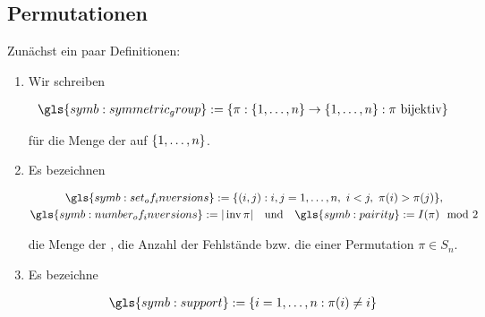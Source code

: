         \subsection{Permutationen}

            Zunächst ein paar Definitionen:

            \begin{definition} \label{def:permutations}
                
                \begin{enumerate}[label = \arabic*.]
    
                    \item Wir schreiben
    
                    \begin{align*}
                        \gls{symb:symmetric_group} := \Bbraces{\pi: \Bbraces{1, \dots, n} \to \Bbraces{1, \dots, n}: \pi ~ \text{bijektiv}}
                    \end{align*}
        
                    für die Menge der  auf ${\left \{ 1, \dots, n \right \}}$.
    
                    \item Es bezeichnen

                    \begin{multline*}
                        \gls{symb:set_of_inversions} := \Bbraces{(i, j): i, j = 1, \dots, n, ~ i < j, ~ \pi(i) > \pi(j)}, \\
                        \gls{symb:number_of_inversions} := |\inv \pi|
                        \quad
                        \text{und}
                        \quad
                        \gls{symb:pairity} := I(\pi) \mod 2
                    \end{multline*}

                    die Menge der , die Anzahl der Fehlstände bzw. die  einer Permutation $\pi \in S_n$.

                    \item Es bezeichne

                    \begin{align*}
                        \gls{symb:support} := \Bbraces{i = 1, \dots, n: \pi(i) \neq i}
                    \end{align*}
       

\end{enumerate}
\end{definition}
